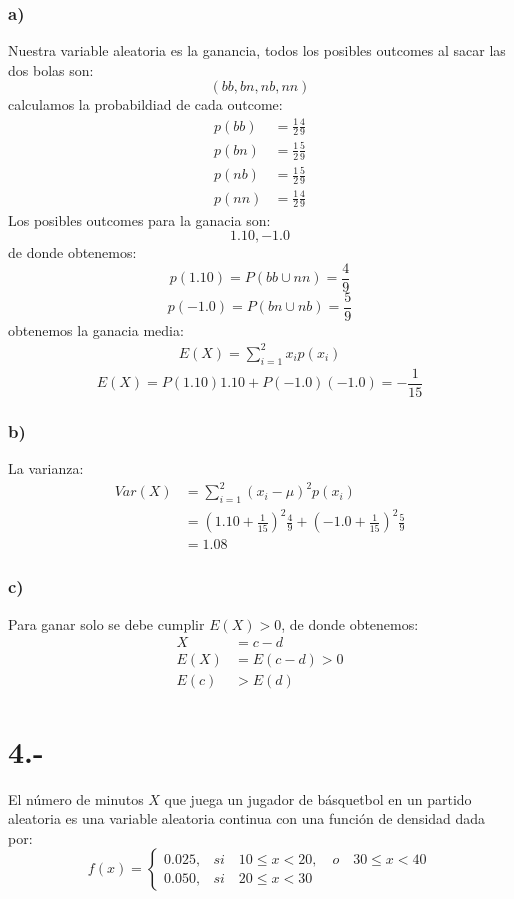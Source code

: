 \documentclass{article}
\begin{document}
\begin{tcolorbox}[breakable]
    \subsubsection*{a)}
    Nuestra variable aleatoria es la ganancia, todos los posibles outcomes al sacar las dos bolas son:
    \[ (bb,bn,nb,nn) \]
    calculamos la probabildiad de cada outcome:
    \begin{align*}
        p(bb) 
        &= \frac{1}{2}\frac{4}{9} \\
        p(bn)
        &= \frac{1}{2}\frac{5}{9} \\
        p(nb)
        &= \frac{1}{2}\frac{5}{9} \\ 
        p(nn)
        &= \frac{1}{2}\frac{4}{9}
    \end{align*}
    Los posibles outcomes para la ganacia son:
    \[ 1.10, -1.0 \]
    de donde obtenemos:
    \[ p(1.10) = P(bb \cup nn) = \frac{4}{9} \]
    \[ p(-1.0) = P(bn \cup nb) = \frac{5}{9} \]
    obtenemos la ganacia media:
    \begin{align*}
        E(X) = \sum_{i=1}^2 x_ip(x_i)
    \end{align*}
    \[ E(X) = P(1.10)1.10 + P(-1.0)(-1.0) = -\frac{1}{15} \]
    \subsubsection*{b)}
    La varianza:
    \begin{align*}
        Var(X)
        &= \sum_{i=1}^2 (x_i - \mu)^2p(x_i) \\ 
        &= (1.10+\tfrac{1}{15})^2\tfrac{4}{9} + (-1.0+\tfrac{1}{15})^2\tfrac{5}{9} \\
        &= 1.08
    \end{align*}

    \subsubsection*{c)}
    Para ganar solo se debe cumplir $E(X)>0$, de donde obtenemos:
    \begin{align*}
        X &= c-d \\
        E(X) &= E(c-d)>0 \\
        E(c) &> E(d)
    \end{align*}

\end{tcolorbox}

\section*{4.-}
El número de minutos $X$ que juega un jugador de básquetbol en un partido aleatoria es una variable aleatoria continua
con una función de densidad dada por:
\[ f(x) =
\begin{cases}
    0.025, & si \quad 10 \leq x < 20, \quad o \quad 30 \leq x < 40 \\
    0.050, & si \quad 20 \leq x < 30
\end{cases}
\]
\end{document}
